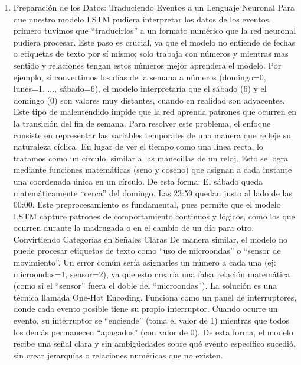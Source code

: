 \begin{enumerate}
            \begin{enumerate}
                  \item Preparación de los Datos: Traduciendo Eventos a un Lenguaje Neuronal
                        Para que nuestro modelo LSTM pudiera interpretar los datos de los eventos, primero tuvimos que ``traducirlos'' a un formato numérico que la red neuronal pudiera procesar. Este paso es crucial, ya que el modelo no entiende de fechas o etiquetas de texto por sí mismo; solo trabaja con números y mientras mas sentido y relaciones tengan estos números mejor aprendera el modelo.
                        Por ejemplo, si convertimos los días de la semana a números (domingo=0, lunes=1, ..., sábado=6), el modelo interpretaría que el sábado (6) y el domingo (0) son valores muy distantes, cuando en realidad son adyacentes. Este tipo de malentendido impide que la red aprenda patrones que ocurren en la transición del fin de semana.
                        Para resolver este problema, el enfoque consiste en representar las variables temporales de una manera que refleje su naturaleza cíclica. En lugar de ver el tiempo como una línea recta, lo tratamos como un círculo, similar a las manecillas de un reloj. Esto se logra mediante funciones matemáticas (seno y coseno) que asignan a cada instante una coordenada única en un círculo. De esta forma:
                        El sábado queda matemáticamente ``cerca'' del domingo.
                        Las 23:59 quedan justo al lado de las 00:00.
                        Este preprocesamiento es fundamental, pues permite que el modelo LSTM capture patrones de comportamiento continuos y lógicos, como los que ocurren durante la madrugada o en el cambio de un día para otro.
                        Convirtiendo Categorías en Señales Claras
                        De manera similar, el modelo no puede procesar etiquetas de texto como ``uso de microondas'' o ``sensor de movimiento''. Un error común sería asignarles un número a cada una (ej: microondas=1, sensor=2), ya que esto crearía una falsa relación matemática (como si el ``sensor'' fuera el doble del ``microondas'').
                        La solución es una técnica llamada One-Hot Encoding. Funciona como un panel de interruptores, donde cada evento posible tiene su propio interruptor.
                        Cuando ocurre un evento, su interruptor se ``enciende'' (toma el valor de 1) mientras que todos los demás permanecen ``apagados'' (con valor de 0). De esta forma, el modelo recibe una señal clara y sin ambigüedades sobre qué evento específico sucedió, sin crear jerarquías o relaciones numéricas que no existen.

\end{enumerate}
\end{enumerate}
